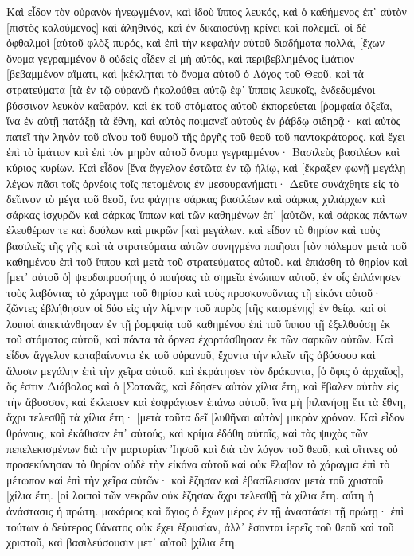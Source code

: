 Καὶ εἶδον τὸν οὐρανὸν ἠνεῳγμένον, καὶ ἰδοὺ ἵππος λευκός, καὶ ὁ καθήμενος ἐπ᾽ αὐτὸν [πιστὸς καλούμενος] καὶ ἀληθινός, καὶ ἐν δικαιοσύνῃ κρίνει καὶ πολεμεῖ. 
οἱ δὲ ὀφθαλμοὶ [αὐτοῦ φλὸξ πυρός, καὶ ἐπὶ τὴν κεφαλὴν αὐτοῦ διαδήματα πολλά, [ἔχων ὄνομα γεγραμμένον ὃ οὐδεὶς οἶδεν εἰ μὴ αὐτός, 
καὶ περιβεβλημένος ἱμάτιον [βεβαμμένον αἵματι, καὶ [κέκληται τὸ ὄνομα αὐτοῦ ὁ Λόγος τοῦ Θεοῦ. 
καὶ τὰ στρατεύματα [τὰ ἐν τῷ οὐρανῷ ἠκολούθει αὐτῷ ἐφ᾽ ἵπποις λευκοῖς, ἐνδεδυμένοι βύσσινον λευκὸν καθαρόν. 
καὶ ἐκ τοῦ στόματος αὐτοῦ ἐκπορεύεται [ῥομφαία ὀξεῖα, ἵνα ἐν αὐτῇ πατάξῃ τὰ ἔθνη, καὶ αὐτὸς ποιμανεῖ αὐτοὺς ἐν ῥάβδῳ σιδηρᾷ· καὶ αὐτὸς πατεῖ τὴν ληνὸν τοῦ οἴνου τοῦ θυμοῦ τῆς ὀργῆς τοῦ θεοῦ τοῦ παντοκράτορος. 
καὶ ἔχει ἐπὶ τὸ ἱμάτιον καὶ ἐπὶ τὸν μηρὸν αὐτοῦ ὄνομα γεγραμμένον· Βασιλεὺς βασιλέων καὶ κύριος κυρίων. 
Καὶ εἶδον [ἕνα ἄγγελον ἑστῶτα ἐν τῷ ἡλίῳ, καὶ [ἔκραξεν φωνῇ μεγάλῃ λέγων πᾶσι τοῖς ὀρνέοις τοῖς πετομένοις ἐν μεσουρανήματι· Δεῦτε συνάχθητε εἰς τὸ δεῖπνον τὸ μέγα τοῦ θεοῦ, 
ἵνα φάγητε σάρκας βασιλέων καὶ σάρκας χιλιάρχων καὶ σάρκας ἰσχυρῶν καὶ σάρκας ἵππων καὶ τῶν καθημένων ἐπ᾽ [αὐτῶν, καὶ σάρκας πάντων ἐλευθέρων τε καὶ δούλων καὶ μικρῶν [καὶ μεγάλων. 
καὶ εἶδον τὸ θηρίον καὶ τοὺς βασιλεῖς τῆς γῆς καὶ τὰ στρατεύματα αὐτῶν συνηγμένα ποιῆσαι [τὸν πόλεμον μετὰ τοῦ καθημένου ἐπὶ τοῦ ἵππου καὶ μετὰ τοῦ στρατεύματος αὐτοῦ. 
καὶ ἐπιάσθη τὸ θηρίον καὶ [μετ᾽ αὐτοῦ ὁ] ψευδοπροφήτης ὁ ποιήσας τὰ σημεῖα ἐνώπιον αὐτοῦ, ἐν οἷς ἐπλάνησεν τοὺς λαβόντας τὸ χάραγμα τοῦ θηρίου καὶ τοὺς προσκυνοῦντας τῇ εἰκόνι αὐτοῦ· ζῶντες ἐβλήθησαν οἱ δύο εἰς τὴν λίμνην τοῦ πυρὸς [τῆς καιομένης] ἐν θείῳ. 
καὶ οἱ λοιποὶ ἀπεκτάνθησαν ἐν τῇ ῥομφαίᾳ τοῦ καθημένου ἐπὶ τοῦ ἵππου τῇ ἐξελθούσῃ ἐκ τοῦ στόματος αὐτοῦ, καὶ πάντα τὰ ὄρνεα ἐχορτάσθησαν ἐκ τῶν σαρκῶν αὐτῶν. 
Καὶ εἶδον ἄγγελον καταβαίνοντα ἐκ τοῦ οὐρανοῦ, ἔχοντα τὴν κλεῖν τῆς ἀβύσσου καὶ ἅλυσιν μεγάλην ἐπὶ τὴν χεῖρα αὐτοῦ. 
καὶ ἐκράτησεν τὸν δράκοντα, [ὁ ὄφις ὁ ἀρχαῖος], ὅς ἐστιν Διάβολος καὶ ὁ [Σατανᾶς, καὶ ἔδησεν αὐτὸν χίλια ἔτη, 
καὶ ἔβαλεν αὐτὸν εἰς τὴν ἄβυσσον, καὶ ἔκλεισεν καὶ ἐσφράγισεν ἐπάνω αὐτοῦ, ἵνα μὴ [πλανήσῃ ἔτι τὰ ἔθνη, ἄχρι τελεσθῇ τὰ χίλια ἔτη· [μετὰ ταῦτα δεῖ [λυθῆναι αὐτὸν] μικρὸν χρόνον. 
Καὶ εἶδον θρόνους, καὶ ἐκάθισαν ἐπ᾽ αὐτούς, καὶ κρίμα ἐδόθη αὐτοῖς, καὶ τὰς ψυχὰς τῶν πεπελεκισμένων διὰ τὴν μαρτυρίαν Ἰησοῦ καὶ διὰ τὸν λόγον τοῦ θεοῦ, καὶ οἵτινες οὐ προσεκύνησαν τὸ θηρίον οὐδὲ τὴν εἰκόνα αὐτοῦ καὶ οὐκ ἔλαβον τὸ χάραγμα ἐπὶ τὸ μέτωπον καὶ ἐπὶ τὴν χεῖρα αὐτῶν· καὶ ἔζησαν καὶ ἐβασίλευσαν μετὰ τοῦ χριστοῦ [χίλια ἔτη. 
[οἱ λοιποὶ τῶν νεκρῶν οὐκ ἔζησαν ἄχρι τελεσθῇ τὰ χίλια ἔτη. αὕτη ἡ ἀνάστασις ἡ πρώτη. 
μακάριος καὶ ἅγιος ὁ ἔχων μέρος ἐν τῇ ἀναστάσει τῇ πρώτῃ· ἐπὶ τούτων ὁ δεύτερος θάνατος οὐκ ἔχει ἐξουσίαν, ἀλλ᾽ ἔσονται ἱερεῖς τοῦ θεοῦ καὶ τοῦ χριστοῦ, καὶ βασιλεύσουσιν μετ᾽ αὐτοῦ [χίλια ἔτη. 
